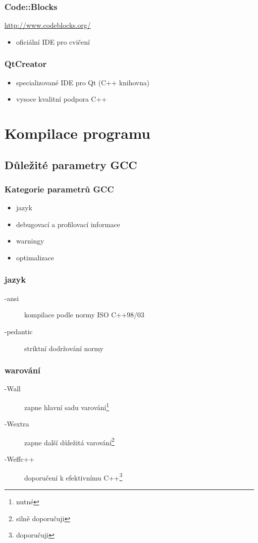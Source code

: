 \begin{frame}
	\frametitle{Code::Blocks}
	\href{http://www.codeblocks.org/}{http://www.codeblocks.org/}
	\begin{itemize}
		\item{oficiální IDE pro cvičení}
	\end{itemize}
\end{frame}

\begin{frame}
	\frametitle{QtCreator}
	\begin{itemize}
		\item{specializované IDE pro Qt (C++ knihovna)}
		\item{vysoce kvalitní podpora C++}
	\end{itemize}
\end{frame}

\section{Kompilace programu}
\subsection{Důležité parametry GCC}

\begin{frame}
	\frametitle{Kategorie parametrů GCC}
	\begin{itemize}
		\item{jazyk}
		\item{debugovací a profilovací informace}
		\item{warningy}
		\item{optimalizace}
	\end{itemize}
\end{frame}

\begin{frame}
	\frametitle{jazyk}
	\begin{description}
		\item[-ansi]{kompilace podle normy ISO C++98/03}
		\item[-pedantic]{striktní dodržování normy}
	\end{description}
\end{frame}

\begin{frame}
	\frametitle{warování}
	\begin{description}
		\item[-Wall]{zapne hlavní sadu varování\footnote{\alert{nutné}}}
		\item[-Wextra]{zapne další důležitá varování\footnote{silně doporučuji}}
		\item[-Weffc++]{doporučení k efektivnímu C++\footnote{doporučuji}}
	\end{description}
\end{frame}

